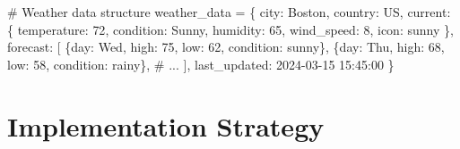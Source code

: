 \documentclass[
  letterpaper,
  DIV=11,
  numbers=noendperiod,
  oneside]{scrreprt}
\newenvironment{Shaded}{}{}
\newcommand{\CommentTok}[1]{\textcolor[rgb]{0.42,0.45,0.49}{#1}}
\newcommand{\DecValTok}[1]{\textcolor[rgb]{0.00,0.36,0.77}{#1}}
\newcommand{\NormalTok}[1]{\textcolor[rgb]{0.14,0.16,0.18}{#1}}
\newcommand{\OperatorTok}[1]{\textcolor[rgb]{0.14,0.16,0.18}{#1}}
\newcommand{\StringTok}[1]{\textcolor[rgb]{0.01,0.18,0.38}{#1}}
\begin{document}
\begin{Shaded}
\begin{Highlighting}[]
\CommentTok{\# Weather data structure}
\NormalTok{weather\_data }\OperatorTok{=}\NormalTok{ \{}
    \StringTok{\textquotesingle{}city\textquotesingle{}}\NormalTok{: }\StringTok{\textquotesingle{}Boston\textquotesingle{}}\NormalTok{,}
    \StringTok{\textquotesingle{}country\textquotesingle{}}\NormalTok{: }\StringTok{\textquotesingle{}US\textquotesingle{}}\NormalTok{,}
    \StringTok{\textquotesingle{}current\textquotesingle{}}\NormalTok{: \{}
        \StringTok{\textquotesingle{}temperature\textquotesingle{}}\NormalTok{: }\DecValTok{72}\NormalTok{,}
        \StringTok{\textquotesingle{}condition\textquotesingle{}}\NormalTok{: }\StringTok{\textquotesingle{}Sunny\textquotesingle{}}\NormalTok{,}
        \StringTok{\textquotesingle{}humidity\textquotesingle{}}\NormalTok{: }\DecValTok{65}\NormalTok{,}
        \StringTok{\textquotesingle{}wind\_speed\textquotesingle{}}\NormalTok{: }\DecValTok{8}\NormalTok{,}
        \StringTok{\textquotesingle{}icon\textquotesingle{}}\NormalTok{: }\StringTok{\textquotesingle{}sunny\textquotesingle{}}
\NormalTok{    \},}
    \StringTok{\textquotesingle{}forecast\textquotesingle{}}\NormalTok{: [}
\NormalTok{        \{}\StringTok{\textquotesingle{}day\textquotesingle{}}\NormalTok{: }\StringTok{\textquotesingle{}Wed\textquotesingle{}}\NormalTok{, }\StringTok{\textquotesingle{}high\textquotesingle{}}\NormalTok{: }\DecValTok{75}\NormalTok{, }\StringTok{\textquotesingle{}low\textquotesingle{}}\NormalTok{: }\DecValTok{62}\NormalTok{, }\StringTok{\textquotesingle{}condition\textquotesingle{}}\NormalTok{: }\StringTok{\textquotesingle{}sunny\textquotesingle{}}\NormalTok{\},}
\NormalTok{        \{}\StringTok{\textquotesingle{}day\textquotesingle{}}\NormalTok{: }\StringTok{\textquotesingle{}Thu\textquotesingle{}}\NormalTok{, }\StringTok{\textquotesingle{}high\textquotesingle{}}\NormalTok{: }\DecValTok{68}\NormalTok{, }\StringTok{\textquotesingle{}low\textquotesingle{}}\NormalTok{: }\DecValTok{58}\NormalTok{, }\StringTok{\textquotesingle{}condition\textquotesingle{}}\NormalTok{: }\StringTok{\textquotesingle{}rainy\textquotesingle{}}\NormalTok{\},}
        \CommentTok{\# ...}
\NormalTok{    ],}
    \StringTok{\textquotesingle{}last\_updated\textquotesingle{}}\NormalTok{: }\StringTok{\textquotesingle{}2024{-}03{-}15 15:45:00\textquotesingle{}}
\NormalTok{\}}
\end{Highlighting}
\end{Shaded}

\section{Implementation Strategy}\label{implementation-strategy-9}
\end{document}
